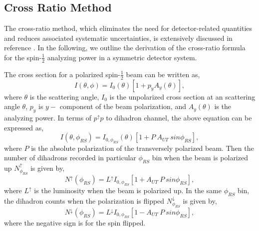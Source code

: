 \subsection{Cross Ratio Method}
The cross-ratio method, which eliminates the need for detector-related quantities and reduces associated systematic uncertainties, is extensively discussed in reference \cite{Ohlsen:1973wf}. In the following, we outline the derivation of the cross-ratio formula for the spin-$\frac{1}{2}$ analyzing power in a symmetric detector system.

The cross section for a polarized spin-$\frac{1}{2}$ beam can be written as, 
\begin{equation}
    \label{eq:cr1}
    I(\theta, \phi) = I_0 (\theta) [1+p_y A_y(\theta)],
\end{equation}
where $\theta$ is the scattering angle, $I_0$ is the unpolarized cross section at an scattering angle $\theta$, $p_y$ is $y-$ component of the beam polarization, and $A_y(\theta)$ is the analyzing power. In terms of $p^\uparrow p$ to dihadron channel, the above equation can be expressed as, 
\begin{equation}
    \label{eq:cr2}
    I(\theta, \phi_{RS}) = I_{0,\phi_{RS}} (\theta) [1+P\ A_{UT}\ sin \phi_{RS} ], 
\end{equation}
where $P$ is the absolute polarization of the transversely polarized beam. 
Then the number of dihadrons recorded in particular $\phi_{RS}$ bin when the beam is polarized up $N^\uparrow_{\phi_{RS}}$ is given by, 
\begin{equation}
    N^\uparrow(\phi_{RS}) = L^\uparrow I_{0,\phi_{RS}}[1+A_{UT}\ P\ sin\phi_{RS}],
\end{equation}
where $L^\uparrow$ is the luminosity when the beam is polarized up.
In the same $\phi_{RS}$ bin, the dihadron counts when the polarization is flipped $N^\downarrow_{\phi_{RS}}$ is given by, 
\begin{equation}
    N^\downarrow(\phi_{RS})= L^\downarrow I_{0,\phi_{RS}}[1-A_{UT}\ P\ sin\phi_{RS}],
\end{equation}
where the negative sign is for the spin flipped.

